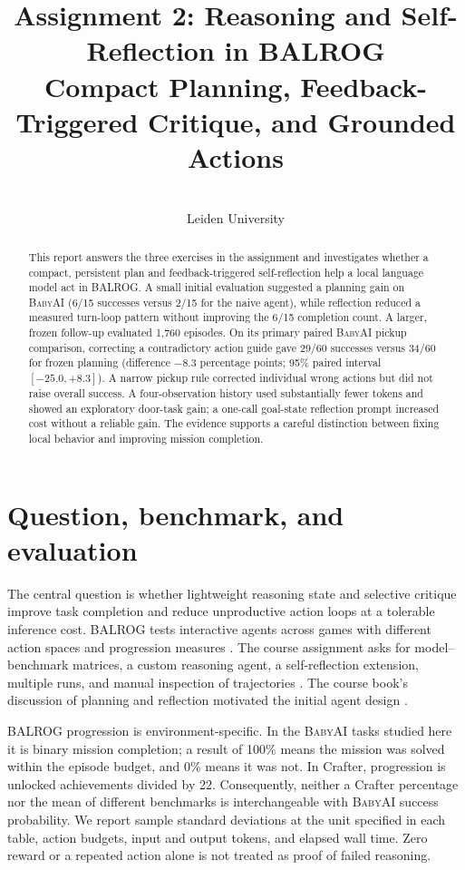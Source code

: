 \documentclass[11pt,a4paper]{article}
\title{Assignment 2: Reasoning and Self-Reflection in BALROG\\
\large Compact Planning, Feedback-Triggered Critique, and Grounded Actions}
\author{\missing{Student name and student number}\\Leiden University}
\date{\missing{Submission date}}
\newcommand{\BabyAI}{\textsc{BabyAI}}
\begin{document}
\maketitle

\begin{abstract}
This report answers the three exercises in the assignment and investigates whether a compact, persistent plan and feedback-triggered self-reflection help a local language model act in BALROG. A small initial evaluation suggested a planning gain on \BabyAI{} (6/15 successes versus 2/15 for the naive agent), while reflection reduced a measured turn-loop pattern without improving the 6/15 completion count. A larger, frozen follow-up evaluated 1,760 episodes. On its primary paired \BabyAI{} pickup comparison, correcting a contradictory action guide gave 29/60 successes versus 34/60 for frozen planning (difference $-8.3$ percentage points; 95\% paired interval $[-25.0,+8.3]$). A narrow pickup rule corrected individual wrong actions but did not raise overall success. A four-observation history used substantially fewer tokens and showed an exploratory door-task gain; a one-call goal-state reflection prompt increased cost without a reliable gain. The evidence supports a careful distinction between fixing local behavior and improving mission completion.
\end{abstract}

\section{Question, benchmark, and evaluation}

The central question is whether lightweight reasoning state and selective critique improve task completion and reduce unproductive action loops at a tolerable inference cost. BALROG tests interactive agents across games with different action spaces and progression measures \cite{balrog}. The course assignment asks for model--benchmark matrices, a custom reasoning agent, a self-reflection extension, multiple runs, and manual inspection of trajectories \cite{assignment}. The course book's discussion of planning and reflection motivated the initial agent design \cite{book}.

BALROG progression is environment-specific. In the \BabyAI{} tasks studied here it is binary mission completion; a result of 100\% means the mission was solved within the episode budget, and 0\% means it was not. In Crafter, progression is unlocked achievements divided by 22. Consequently, neither a Crafter percentage nor the mean of different benchmarks is interchangeable with \BabyAI{} success probability. We report sample standard deviations at the unit specified in each table, action budgets, input and output tokens, and elapsed wall time. Zero reward or a repeated action alone is not treated as proof of failed reasoning.
\end{document}
